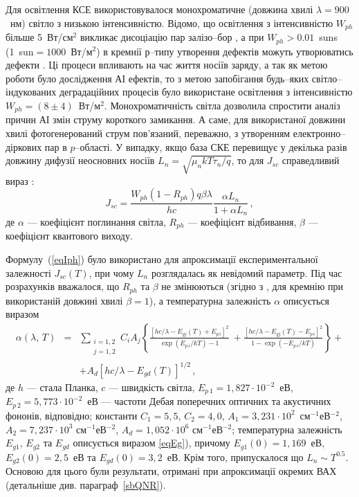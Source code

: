 Для освітлення КСЕ використовувалося монохроматичне (довжина хвилі $\lambda=900$~нм) світло з низькою інтенсивністю.
Відомо, що освітлення з інтенсивністю $W_{ph}$ більше 5~Вт/см$^2$ викликає дисоціацію пар залізо--бор \cite{LID:CuII},
а при $W_{ph}>0.01$~suns (1~sun$=1000$~Вт/м$^2$) в кремнії р--типу утворення дефектів можуть утворюватись дефекти \cite{BO:Halam2016}.
Ці процеси впливають на час життя носіїв заряду, а так як метою роботи було дослідження АІ ефектів,
то з метою запобігання будь--яких світло--індукованих деградаційних процесів було використане
освітлення з інтенсивністю $W_{ph}=(8\pm4)$~Вт/м$^2$.
Монохроматичність світла дозволила спростити аналіз причин АІ змін струму короткого замикання.
А саме, для використаної довжини хвилі фотогенерований струм пов'язаний, переважно, з утворенням електронно--діркових пар в $p$--області.
У випадку, якщо база СКЕ перевищує у декілька разів довжину дифузії неосновних носіїв $L_n=\sqrt{\mu_nkT\tau_n/q}$, то
для $J_{sc}$ справедливий вираз \cite{Markvart,Razeghi,Faren}:
\begin{equation}
\label{eqIph}
J_{sc} = \frac{W_{ph}(1-R_{ph})q\beta\lambda}{hc}\frac{\alpha L_n}{1+ \alpha L_n}\,,
\end{equation}
де
$\alpha$ --- коефіцієнт поглинання світла,
$R_{ph}$ --- коефіцієнт відбивання,
$\beta$ --- коефіцієнт квантового виходу.

Формулу~(\ref{eqIph}) було використано для апроксимації експериментальної залежності $J_{sc}(T)$,
при чому $L_n$ розглядалась як невідомий параметр.
Під час розрахунків вважалося, що $R_{ph}$ та $\beta$ не змінюються (згідно з \cite{Gaman}, для кремнію
при використаній довжині хвилі $\beta=1$),
а температурна залежність $\alpha$ описується виразом \cite{Markvart,Si:Absorb}
\begin{eqnarray}
\label{eqAlpha}
\nonumber \alpha(\lambda,\,T)&=&\sum_{\substack{i=1,2\\j=1,2}}\!C_iA_j\left\{\frac{[hc/\lambda-E_{gj}(T)+E_{p\,i}]^2}{\exp(E_{p\,i}/kT)-1}\:+
\frac{[hc/\lambda-E_{gj}(T)-E_{p\,i}]^2}{1-\exp(-E_{p\,i}/kT)}\right\}+\\
&&+A_d\left[hc/\lambda-E_{gd}(T)\right]^{1/2}\,,
\end{eqnarray}
де
$h$ --- стала Планка,
$c$ --- швидкість світла,
$E_{p\,1}=1,827\cdot10^{-2}$~еВ,
$E_{p\,2}=5,773\cdot10^{-2}$~еВ --- частоти Дебая поперечних
оптичних та акустичних фононів, відповідно;
константи $C_1=5,5$,
$C_2=4,0$,
$A_1=3,231\cdot10^2$~см$^{-1}$еВ$^{-2}$,
$A_2=7,237\cdot10^3$ см$^{-1}$еВ$^{-2}$,
$A_d=1,052\cdot10^6$ см$^{-1}$еВ$^{-2}$;
температурна залежність $E_{g1}$, $E_{g2}$ та $E_{gd}$ описується виразом \ref{eqEg}),
причому $E_{g1}(0)=1,169$~еВ, $E_{g2}(0)=2,5$~еВ та $E_{gd}(0)=3,2$~еВ.
Крім того, припускалося що $L_n\sim T^{0.5}$.
Основою для цього були результати, отримані при апроксимації окремих ВАХ (детальніше див. параграф~\ref{sbQNR}).

